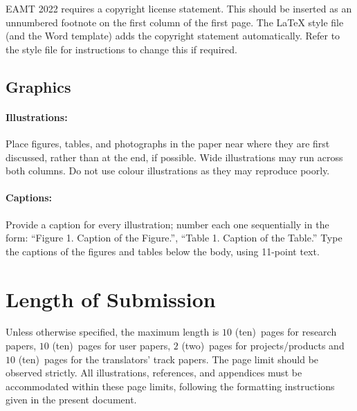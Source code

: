 \documentclass[11pt]{article}
\newcommand{\confname}{EAMT 2022}
\newcommand{\paperlength}{$10$ (ten)}
\newcommand{\shortpaperlength}{$10$ (ten)}
\newcommand{\projectlength}{$2$ (two)}
\newcommand{\translatorlength}{$10$ (ten)}
\begin{document}
\confname{} requires a copyright license statement. This should be inserted as
an unnumbered footnote on the first column of the first page. The \LaTeX{} style file
(and the Word template) adds the copyright statement automatically. Refer to the style file for instructions to
change this if required.

\subsection{Graphics}

\paragraph{Illustrations:} Place figures, tables, and photo\-graphs in the
paper near where they are first discussed, rather than at the end, if
possible.  Wide illustrations may run across both columns. Do not use
colour illustrations as they may reproduce poorly.

\paragraph{Captions:} Provide a caption for every illustration; number
each one sequentially in the form:  ``Figure 1. Caption of the
Figure.'', ``Table 1. Caption of the Table.''  Type the captions of
the figures and tables below the body, using 11-point text.


\section{Length of Submission}
\label{sec:length}

Unless otherwise specified, the maximum length is \paperlength~pages for research papers, \shortpaperlength~pages for user papers, \projectlength~pages for projects/products and
\translatorlength~pages for the translators' track papers. 
The page limit should be
observed strictly. All illustrations, references, and appendices must be
accommodated within these page limits, following the formatting instructions
given in the present document.

% 
\end{document}
